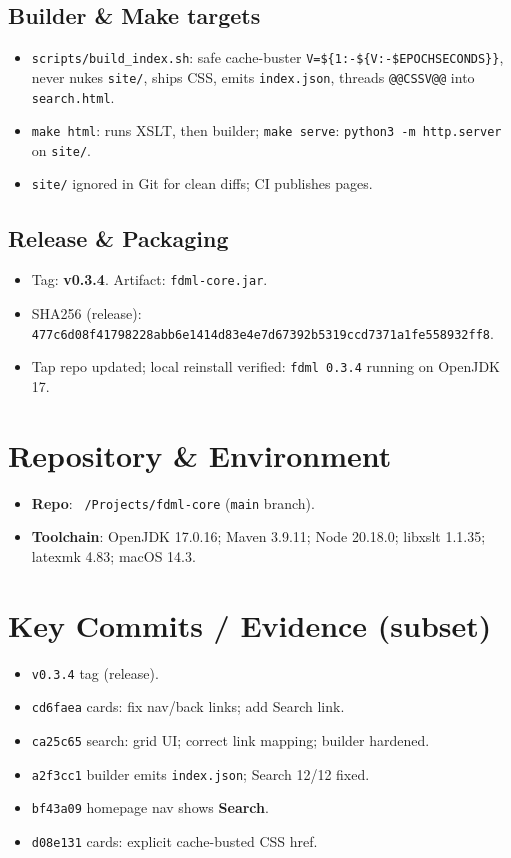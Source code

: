 \documentclass[11pt,a4paper]{article}
\newcommand{\code}[1]{\texttt{#1}}
\begin{document}
\subsection{Builder \& Make targets}
\begin{itemize}[leftmargin=1.2em]
  \item \code{scripts/build\_index.sh}: safe cache-buster \code{V=\$\{1:-\$\{V:-\$EPOCHSECONDS\}\}}, never nukes \code{site/}, ships CSS, emits \code{index.json}, threads \code{@@CSSV@@} into \code{search.html}.
  \item \code{make html}: runs XSLT, then builder; \code{make serve}: \code{python3 -m http.server} on \code{site/}.
  \item \code{site/} ignored in Git for clean diffs; CI publishes pages.
\end{itemize}

\subsection{Release \& Packaging}
\begin{itemize}[leftmargin=1.2em]
  \item Tag: \textbf{v0.3.4}. Artifact: \code{fdml-core.jar}. 
  \item SHA256 (release): \code{477c6d08f41798228abb6e1414d83e4e7d67392b5319ccd7371a1fe558932ff8}.
  \item Tap repo updated; local reinstall verified: \code{fdml 0.3.4} running on OpenJDK 17.
\end{itemize}

\section{Repository \& Environment}
\begin{itemize}[leftmargin=1.2em]
  \item \textbf{Repo}: \code{\string~/Projects/fdml-core} (\code{main} branch).
  \item \textbf{Toolchain}: OpenJDK 17.0.16; Maven 3.9.11; Node 20.18.0; libxslt 1.1.35; latexmk 4.83; macOS 14.3.
\end{itemize}

\section{Key Commits / Evidence (subset)}
\begin{itemize}[leftmargin=1.2em]
  \item \code{v0.3.4} tag (release).
  \item \code{cd6faea} cards: fix nav/back links; add Search link.
  \item \code{ca25c65} search: grid UI; correct link mapping; builder hardened.
  \item \code{a2f3cc1} builder emits \code{index.json}; Search 12/12 fixed.
  \item \code{bf43a09} homepage nav shows \textbf{Search}.
  \item \code{d08e131} cards: explicit cache-busted CSS href.
\end{itemize}
\end{document}
